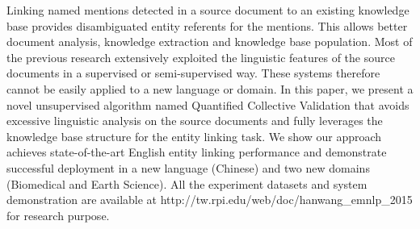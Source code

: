 Linking named mentions detected in a source document to an existing knowledge base provides disambiguated entity referents for the mentions. This allows better document analysis, knowledge extraction and knowledge base population. Most of the previous research extensively exploited the linguistic features of the source documents in a supervised or semi-supervised way. These systems therefore cannot be easily applied to a new language or domain. In this paper, we present a novel unsupervised algorithm named Quantified Collective Validation that avoids excessive linguistic analysis on the source documents and fully leverages the knowledge base structure for the entity linking task. We show our approach achieves state-of-the-art English entity linking performance and demonstrate successful deployment in a new language (Chinese) and two new domains (Biomedical and Earth Science). All the experiment datasets and system demonstration are available at http://tw.rpi.edu/web/doc/hanwang\_emnlp\_2015 for research purpose.
